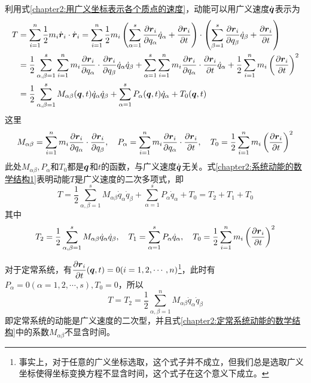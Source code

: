 利用式\eqref{chapter2:用广义坐标表示各个质点的速度}，动能可以用广义速度$\dot{\boldsymbol{q}}$表示为
\begin{align}
	T & = \sum_{i=1}^n \frac12 m_i \dot{\boldsymbol{r}}_i \cdot \dot{\boldsymbol{r}}_i = \sum_{i=1}^n \frac12 m_i \left(\sum_{\alpha=1}^s \frac{\partial \boldsymbol{r}_i}{\partial q_\alpha} \dot{q}_\alpha + \frac{\partial \boldsymbol{r}_i}{\partial t}\right) \cdot \left(\sum_{\beta=1}^s \frac{\partial \boldsymbol{r}_i}{\partial q_\beta} \dot{q}_\beta + \frac{\partial \boldsymbol{r}_i}{\partial t}\right) \nonumber \\
	& = \frac12 \sum_{\alpha,\beta=1}^s \sum_{i=1}^n m_i \frac{\partial \boldsymbol{r}_i}{\partial q_\alpha} \cdot \frac{\partial \boldsymbol{r}_i}{\partial q_\beta} \dot{q}_\alpha \dot{q}_\beta + \sum_{\alpha=1}^s \sum_{i=1}^n m_i \frac{\partial \boldsymbol{r}_i}{\partial q_\alpha} \cdot \frac{\partial \boldsymbol{r}_i}{\partial t} \dot{q}_\alpha + \frac12 \sum_{i=1}^n m_i \left(\frac{\partial \boldsymbol{r}_i}{\partial t}\right)^2 \nonumber \\
	& = \frac12 \sum_{\alpha,\beta=1}^s M_{\alpha\beta}(\boldsymbol{q},t) \dot{q}_\alpha \dot{q}_\beta + \sum_{\alpha=1}^s P_\alpha(\boldsymbol{q},t) \dot{q}_\alpha + T_0(\boldsymbol{q},t)
	\label{chapter2:系统动能的数学结构1}
\end{align}
这里
\begin{equation}
	M_{\alpha\beta} = \sum_{i=1}^n m_i \frac{\partial \boldsymbol{r}_i}{\partial q_\alpha} \cdot \frac{\partial \boldsymbol{r}_i}{\partial q_\beta},\quad P_\alpha = \sum_{i=1}^n m_i \frac{\partial \boldsymbol{r}_i}{\partial q_\alpha} \cdot \frac{\partial \boldsymbol{r}_i}{\partial t},\quad T_0 = \frac12 \sum_{i=1}^n m_i \left(\frac{\partial \boldsymbol{r}_i}{\partial t}\right)^2
	\label{chapter2:以广义坐标表示的系统动能表达式中的系数}
\end{equation}
此处$M_{\alpha\beta}, P_\alpha$和$T_0$都是$\boldsymbol{q}$和$t$的函数，与广义速度$\dot{\boldsymbol{q}}$无关。式\eqref{chapter2:系统动能的数学结构1}表明动能$T$是广义速度的二次多项式，即
\begin{equation}
	T = \frac12 \sum_{\alpha,\beta=1}^s M_{\alpha\beta} \dot{q}_\alpha \dot{q}_\beta + \sum_{\alpha=1}^s P_\alpha \dot{q}_\alpha + T_0 = T_2 + T_1 + T_0
	\label{chapter2:系统动能的数学结构2}
\end{equation}
其中
\begin{equation}
	T_2 = \frac12 \sum_{\alpha,\beta=1}^s M_{\alpha\beta} \dot{q}_\alpha \dot{q}_\beta,\quad T_1 = \sum_{\alpha=1}^s P_\alpha \dot{q}_\alpha,\quad T_0 = \frac12 \sum_{i=1}^n m_i \left(\frac{\partial \boldsymbol{r}_i}{\partial t}\right)^2
	\label{chapter2:系统动能的数学结构3}
\end{equation}

对于定常系统，有$\dfrac{\partial \boldsymbol{r}_i}{\partial t}(\boldsymbol{q},t) = 0(i=1,2,\cdots,n)$\footnote{事实上，对于任意的广义坐标选取，这个式子并不成立，但我们总是选取广义坐标使得坐标变换方程不显含时间，这个式子在这个意义下成立。}，此时有$P_\alpha=0(\alpha=1,2,\cdots,s), T_0=0$，所以
\begin{equation}
	T = T_2 = \frac12 \sum_{\alpha,\beta=1}^n M_{\alpha\beta}\dot{q}_\alpha\dot{q}_\beta
	\label{chapter2:定常系统动能的数学结构}
\end{equation}
即定常系统的动能是广义速度的二次型，并且式\eqref{chapter2:定常系统动能的数学结构}中的系数$M_{\alpha\beta}$不显含时间。

